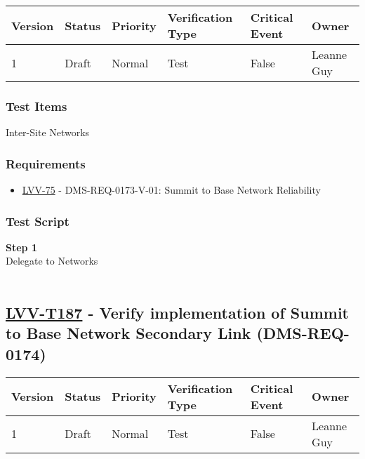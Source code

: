 \begin{longtable}[]{@{}llllll@{}}
\toprule
Version & Status & Priority & Verification Type & Critical Event &
Owner\tabularnewline
\midrule
\endhead
1 & Draft & Normal & Test & False & Leanne Guy\tabularnewline
\bottomrule
\end{longtable}

\hypertarget{test-items-162}{%
\subsubsection{Test Items}\label{test-items-162}}

Inter-Site Networks~

\hypertarget{requirements-163}{%
\subsubsection{Requirements}\label{requirements-163}}

\begin{itemize}
\tightlist
\item
  \href{https://jira.lsstcorp.org/browse/LVV-75}{LVV-75} -
  DMS-REQ-0173-V-01: Summit to Base Network Reliability
\end{itemize}

\hypertarget{test-script-163}{%
\subsubsection{Test Script}\label{test-script-163}}

\textbf{Step 1}\\
Delegate to Networks\\
~\\

\hypertarget{lvv-t187---verify-implementation-of-summit-to-base-network-secondary-link-dms-req-0174}{%
\subsection{\texorpdfstring{\href{https://jira.lsstcorp.org/secure/Tests.jspa\#/testCase/LVV-T187}{LVV-T187}
- Verify implementation of Summit to Base Network Secondary Link
(DMS-REQ-0174)}{LVV-T187 - Verify implementation of Summit to Base Network Secondary Link (DMS-REQ-0174)}}\label{lvv-t187---verify-implementation-of-summit-to-base-network-secondary-link-dms-req-0174}}

\begin{longtable}[]{@{}llllll@{}}
\toprule
Version & Status & Priority & Verification Type & Critical Event &
Owner\tabularnewline
\midrule
\endhead
1 & Draft & Normal & Test & False & Leanne Guy\tabularnewline
\bottomrule
\end{longtable}

